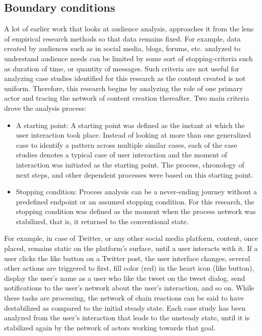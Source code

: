 \subsection{Boundary conditions}
A lot of earlier work that looks at audience analysis, approaches it from the lens of empirical research methods so that data remains fixed. For example, data created by audiences such as in social media, blogs, forums, etc. analyzed to understand audience needs can be limited by some sort of stopping-criteria such as duration of time, or quantity of messages. Such criteria are not useful for analyzing case studies identified for this research as the content created is not uniform. Therefore, this research begins by analyzing the role of one primary actor and tracing the network of content creation thereafter. Two main criteria drove the analysis process:

\begin{itemize}
  \item A starting point: A starting point was defined as the instant at which the user interaction took place. Instead of looking at more than one generalized case to identify a pattern across multiple similar cases, each of the case studies denotes a typical case of user interaction and the moment of interaction was initiated as the starting point. The process, chronology of next steps, and other dependent processes were based on this starting point.
  \item Stopping condition: Process analysis can be a never-ending journey without a predefined endpoint or an assumed stopping condition. For this research, the stopping condition was defined as the moment when the process network was stabilized, that is, it returned to the conventional state.
\end{itemize}

For example, in case of Twitter, or any other social media platform, content, once placed, remains static on the platform's surface, until a user interacts with it. If a user clicks the like button on a Twitter post, the user interface changes, several other actions are triggered to first, fill color (red) in the heart icon (like button), display the user's name as a user who like the tweet on the tweet dialog, send notifications to the user's network about the user's interaction, and so on. While these tasks are processing, the network of chain reactions can be said to have destabilized as compared to the initial steady state. Each case study has been analyzed from the user's interaction that leads to the unsteady state, until it is stabilized again by the network of actors working towards that goal.

